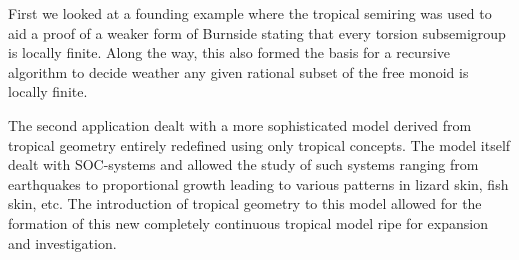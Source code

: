 \documentclass[12pt,a4paper]{amsart}
\theoremstyle{definition}
\theoremstyle{remark}
\begin{document}
First we looked at a founding example where the tropical semiring was used to aid a proof of a weaker form of Burnside stating that every torsion subsemigroup is locally finite. Along the way, this also formed the basis for a recursive algorithm to decide weather any given rational subset of the free monoid is locally finite.

The second application dealt with a more sophisticated model derived from tropical geometry entirely redefined using only tropical concepts. The model itself dealt with SOC-systems and allowed the study of such systems ranging from earthquakes to proportional growth leading to various patterns in lizard skin, fish skin, etc. The introduction of tropical geometry to this model allowed for the formation of this new completely continuous tropical model ripe for expansion and investigation.

\newpage
\printbibliography
\newpage
%    
\end{document}
